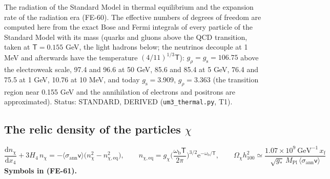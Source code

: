 \documentclass[
  10pt,
]{article}
\begin{document}
The radiation of the Standard Model in thermal equilibrium and the
expansion rate of the radiation era (FE-60). The effective numbers of
degrees of freedom are computed here from the exact Bose and Fermi
integrals of every particle of the Standard Model with its mass (quarks
and gluons above the QCD transition, taken at \(\mathsf{T} = 0.155\)
GeV, the light hadrons below; the neutrinos decouple at 1 MeV and
afterwards have the temperature \((4/11)^{1/3}\mathsf{T}\)):
\(g_\rho = g_{\mathrm{s}} = 106.75\) above the electroweak scale, 97.4
and 96.6 at 50 GeV, 85.6 and 85.4 at 5 GeV, 76.4 and 75.5 at 1 GeV,
10.76 at 10 MeV, and today \(g_{\mathrm{s}} = 3.909\),
\(g_\rho = 3.363\) (the transition region near 0.155 GeV and the
annihilation of electrons and positrons are approximated). Status:
STANDARD, DERIVED (\texttt{um3\_thermal.py}, T1).

\hypertarget{the-relic-density-of-the-particles-chi}{%
\subsection{\texorpdfstring{The relic density of the particles
\(\chi\)}{The relic density of the particles \textbackslash chi}}\label{the-relic-density-of-the-particles-chi}}

\[
\frac{\mathrm{d}n_\chi}{\mathrm{d}x_4} + 3H_4\,n_\chi = -\langle\sigma_{\mathrm{ann}}\mathsf{v}\rangle\big(n_\chi^2 - n_{\chi,\mathrm{eq}}^2\big),\qquad
n_{\chi,\mathrm{eq}} = g_\chi\Big(\frac{\omega_{\mathrm{b}}\mathsf{T}}{2\pi}\Big)^{3/2}\mathrm{e}^{-\omega_{\mathrm{b}}/\mathsf{T}},\qquad
\Omega_\chi h_{100}^2 \simeq \frac{1.07\times10^9\ \text{GeV}^{-1}\,x_{\mathrm{f}}}{\sqrt{g_*}\,M_{\mathrm{Pl}}\,\langle\sigma_{\mathrm{ann}}\mathsf{v}\rangle} \tag{FE-61}
\] \textbf{Symbols in (FE-61).}
\end{document}
